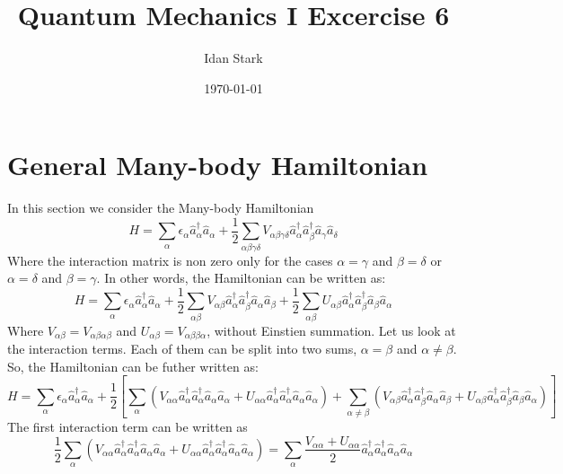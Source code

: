 \documentclass{article}
\title{Quantum Mechanics I Excercise 6}
\author{Idan Stark}
\date{\today}
\begin{document}
\maketitle

\section{General Many-body Hamiltonian}
In this section we consider the Many-body Hamiltonian
\begin{equation}
    H = \sum_\alpha \epsilon_\alpha \hat{a}_\alpha^\dagger \hat{a}_\alpha + \frac{1}{2}\sum_{\alpha\beta\gamma\delta} V_{\alpha\beta\gamma\delta} \hat{a}_\alpha^\dagger \hat{a}_\beta^\dagger \hat{a}_\gamma \hat{a}_\delta
\end{equation}
Where the interaction matrix is non zero only for the cases $\alpha = \gamma$ and $\beta = \delta$ or $\alpha = \delta$ and $\beta = \gamma$. In other words, the Hamiltonian can be written as:
\begin{equation}
    H = \sum_\alpha \epsilon_\alpha \hat{a}_\alpha^\dagger \hat{a}_\alpha + \frac{1}{2}\sum_{\alpha\beta} V_{\alpha\beta} \hat{a}_\alpha^\dagger \hat{a}_\beta^\dagger \hat{a}_\alpha \hat{a}_\beta + \frac{1}{2}\sum_{\alpha\beta} U_{\alpha\beta} \hat{a}_\alpha^\dagger \hat{a}_\beta^\dagger \hat{a}_\beta \hat{a}_\alpha
\end{equation}
Where $V_{\alpha\beta} = V_{\alpha\beta\alpha\beta}$ and $U_{\alpha\beta} = V_{\alpha\beta\beta\alpha}$, without Einstien summation. Let us look at the interaction terms. Each of them can be split into two sums, $\alpha = \beta$ and $\alpha \ne \beta$. So, the Hamiltonian can be futher written as:
\begin{equation}
    H = \sum_\alpha \epsilon_\alpha \hat{a}_\alpha^\dagger \hat{a}_\alpha + \frac{1}{2}\left[\sum_{\alpha} \left(V_{\alpha\alpha} \hat{a}_\alpha^\dagger \hat{a}_\alpha^\dagger \hat{a}_\alpha \hat{a}_\alpha + U_{\alpha\alpha} \hat{a}_\alpha^\dagger \hat{a}_\alpha^\dagger \hat{a}_\alpha \hat{a}_\alpha\right) + \sum_{\alpha \ne \beta} \left(V_{\alpha\beta} \hat{a}_\alpha^\dagger \hat{a}_\beta^\dagger \hat{a}_\alpha \hat{a}_\beta + U_{\alpha\beta} \hat{a}_\alpha^\dagger \hat{a}_\beta^\dagger \hat{a}_\beta \hat{a}_\alpha\right)
    \right]
\end{equation}
The first interaction term can be written as
\begin{equation}
    \frac{1}{2}\sum_{\alpha} \left(V_{\alpha\alpha} \hat{a}_\alpha^\dagger \hat{a}_\alpha^\dagger \hat{a}_\alpha \hat{a}_\alpha + U_{\alpha\alpha} \hat{a}_\alpha^\dagger \hat{a}_\alpha^\dagger \hat{a}_\alpha \hat{a}_\alpha\right) = 
    \sum_{\alpha} \frac{V_{\alpha\alpha} + U_{\alpha\alpha}}{2}  \hat{a}_\alpha^\dagger \hat{a}_\alpha^\dagger \hat{a}_\alpha \hat{a}_\alpha 
\end{equation}
\end{document}
